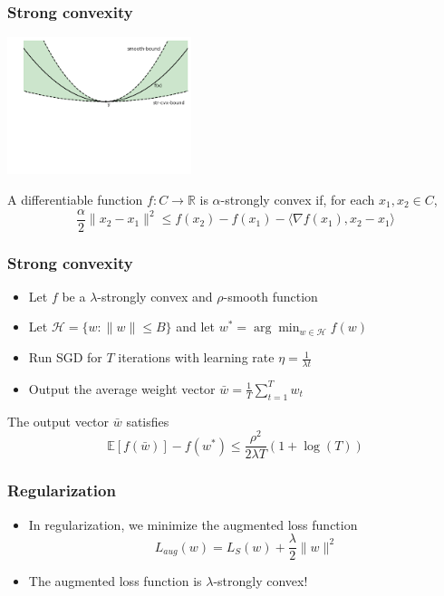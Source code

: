 \documentclass[10pt]{beamer}
\begin{document}
\begin{frame}
  \frametitle{Strong convexity}
  \begin{center}
  \includegraphics[height=4cm]{images/smooth.png}
  \end{center}
  \vspace*{-2cm}
  \begin{definition}
	A differentiable function $f:C\rightarrow\mathbb{R}$ is {\color{red} $\alpha$-strongly convex} if, for each $x_1,x_2\in C$,
	\[\frac \alpha 2 \lVert x_2 - x_1 \rVert^2 \leq f(x_2) - f(x_1) - \langle \nabla f(x_1), x_2 - x_1 \rangle\]
  \end{definition}
\end{frame}

\begin{frame}
  \frametitle{Strong convexity}
  \begin{itemize}
	\item Let $f$ be a $\lambda$-strongly convex and $\rho$-smooth function
	\item Let $\mathcal{H}=\{w:\lVert w\rVert \leq B\}$ and let $w^* = \arg\min_{w\in\mathcal{H}} f(w)$
	\item Run SGD for $T$ iterations with learning rate $\eta = \frac 1 {\lambda t}$
	\item Output the {\color{red} average} weight vector $\bar{w}=\frac 1 T \sum_{t=1}^T w_t$
  \end{itemize}
  \pause
  \begin{theorem}
	The output vector $\bar{w}$ satisfies
	\[\mathbb{E}[f(\bar{w})] - f(w^*) \leq \frac {\rho^2} {2 \lambda T} (1 + \log(T))\]
  \end{theorem}
\end{frame}

\begin{frame}
  \frametitle{Regularization}
  \begin{itemize}
	\item In regularization, we minimize the {\color{red} augmented} loss function
	\[L_{aug}(w) = L_S(w) + \frac \lambda 2 \lVert w \rVert^2\]
	\item The augmented loss function is $\lambda$-strongly convex!
  \end{itemize}
\end{frame}
\end{document}
